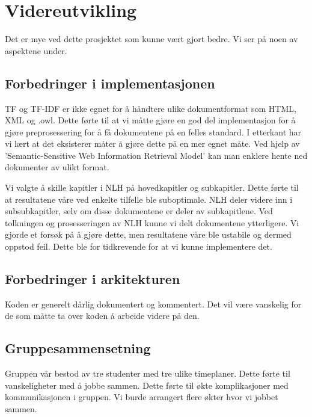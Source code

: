 \section{Videreutvikling}
\label{improvements}

Det er mye ved dette prosjektet som kunne vært gjort bedre. Vi ser på noen av aspektene under.

\subsection{Forbedringer i implementasjonen}
TF og TF-IDF er ikke egnet for å håndtere ulike dokumentformat som HTML, XML og .owl. Dette førte til at vi måtte gjøre en god del implementasjon for å gjøre preprosessering for å få dokumentene på en felles standard. I etterkant har vi lært at det eksisterer måter å gjøre dette på en mer egnet måte. Ved hjelp av 'Semantic-Sensitive Web Information Retrieval Model' kan man enklere hente ned dokumenter av ulikt format. %

Vi valgte å skille kapitler i NLH på hovedkapitler og subkapitler. Dette førte til at resultatene våre ved enkelte tilfelle ble suboptimale. NLH deler videre inn i subsubkapitler, selv om disse dokumentene er deler av subkapitlene. Ved tolkningen og prosesseringen av NLH kunne vi delt dokumentene ytterligere. Vi gjorde et forsøk på å gjøre dette, men resultatene våre ble ustabile og dermed oppstod feil. Dette ble for tidkrevende for at vi kunne implementere det. 

\subsection{Forbedringer i arkitekturen}
Koden er generelt dårlig dokumentert og kommentert. Det vil være vanskelig for de som måtte ta over koden å arbeide videre på den. 


\subsection{Gruppesammensetning}
Gruppen vår bestod av tre studenter med tre ulike timeplaner. Dette førte til vanskeligheter med å jobbe sammen. Dette førte til økte komplikasjoner med kommunikasjonen i gruppen. Vi burde arrangert flere økter hvor vi jobbet sammen. 